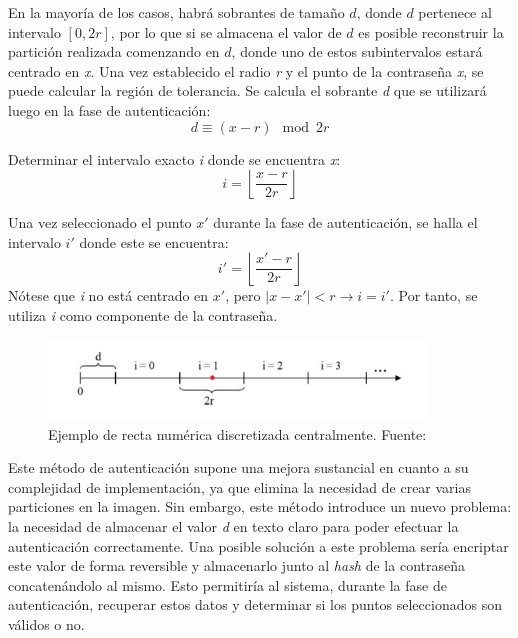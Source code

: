 En la mayoría de los casos, habrá sobrantes de tamaño \(d\), donde \(d\) pertenece al intervalo $[0, 2r]$, por lo que si se almacena el valor de \(d\) es posible reconstruir la partición realizada comenzando en \(d\), donde uno de estos subintervalos estará centrado en \textit{x}. Una vez establecido el radio \textit{r} y el punto de la contraseña \textit{x}, se puede calcular la región de tolerancia. Se calcula el sobrante \textit{d} que se utilizará luego en la fase de autenticación:
\begin{equation}
	d\equiv(x - r)\mod{2r} \label{eq:sobrante}
\end{equation}

Determinar el intervalo exacto \textit{i} donde se encuentra \textit{x}:
\begin{equation}
	i = \left\lfloor \frac{x - r}{2r} \right\rfloor \label{eq:intervalo_registro}
\end{equation}

Una vez seleccionado el punto $x'$ durante la fase de autenticación, se halla el intervalo $i'$ donde este se encuentra:
\begin{equation}
	i' = \left\lfloor \frac{x' - r}{2r} \right\rfloor \label{eq:intervalo_autenticacion}
\end{equation}
Nótese que \textit{i} no está centrado en $x'$, pero \(|x - x'| < r \rightarrow i = i'\). Por tanto, se utiliza \textit{i} como componente de la contraseña.

	\begin{figure}[H]
		\centering
		\includegraphics[width=0.9\textwidth]{image5.png}	
		\caption{Ejemplo de recta num\'erica discretizada centralmente. Fuente: \cite{bicakci2008optimal}}	
	\end{figure}

Este método de autenticación supone una mejora sustancial en cuanto a su complejidad de implementación, ya que elimina la necesidad de crear varias particiones en la imagen. Sin embargo, este método introduce un nuevo problema: la necesidad de almacenar el valor \textit{d} en texto claro para poder efectuar la autenticación correctamente. Una posible solución a este problema sería encriptar este valor de forma reversible y almacenarlo junto al \textit{hash} de la contraseña concatenándolo al mismo. Esto permitiría al sistema, durante la fase de autenticación, recuperar estos datos y determinar si los puntos seleccionados son válidos o no.


